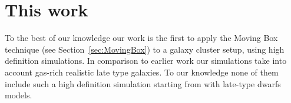 \section{This work}
To the best of our knowledge our work is the first to apply the Moving Box technique (see Section~\ref{sec:MovingBox}) to a galaxy cluster setup, using high definition simulations.
In comparison to earlier work our simulations take into account gas-rich realistic late type galaxies. To our knowledge none of them include such a high definition simulation starting from with late-type dwarfs models.
